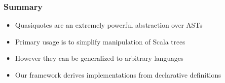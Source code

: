 \begin{frame}[fragile]
  \frametitle{Summary}
  \begin{itemize}
    \item Quasiquotes are an extremely powerful abstraction over ASTs
    \item Primary usage is to simplify manipulation of Scala trees
    \item However they can be generalized to arbitrary languages
    \item Our framework derives implementations from declarative definitions
  \end{itemize}
\end{frame}